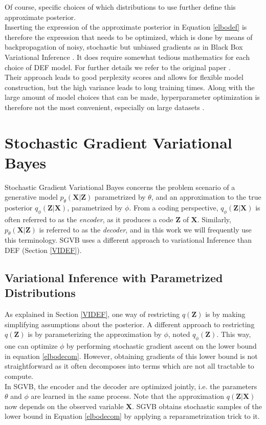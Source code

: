 \documentclass{report}
\begin{document}
Of course, specific choices of which distributions to use further define this approximate posterior. \\
Inserting the expression of the approximate posterior in Equation \ref{elbodef} is therefore the expression that needs to be optimized, which is done by means of backpropagation of noisy, stochastic but unbiased gradients as in Black Box Variational Inference \cite{ranganath2014black}. It does require somewhat tedious mathematics for each choice of DEF model. For further details we refer to the original paper \cite{ranganath2015deep}. \\
Their approach leads to good perplexity scores and allows for flexible model construction, but the high variance leads to long training times. Along with the large amount of model choices that can be made, hyperparameter optimization is therefore not the most convenient, especially on large datasets \cite{ranganath2015deep}.	

\section{Stochastic Gradient Variational Bayes}\label{sgvb_section}


Stochastic Gradient Variational Bayes concerns the problem scenario of a generative model $p_\theta(\mathbf{X}|\mathbf{Z})$ parametrized by $\theta$, and an approximation to the true posterior $q_\phi(\mathbf{Z}|\mathbf{X})$, parametrized by $\phi$. From a coding perspective, $q_\phi(\mathbf{Z}|\mathbf{X})$ is often referred to as the \textit{encoder}, as it produces a code $\mathbf{Z}$ of $\mathbf{X}$. Similarly, $p_\theta(\mathbf{X}|\mathbf{Z})$ is referred to as the \textit{decoder}, and in this work we will frequently use this terminology. SGVB uses a different approach to variational Inference than DEF (Section \ref{VIDEF}).

\subsection{Variational Inference with Parametrized Distributions}\label{paramVI}
As explained in Section \ref{VIDEF}, one way of restricting $q(\mathbf{Z})$ is by making simplifying assumptions about the posterior. A different approach to restricting $q(\mathbf{Z})$ is by parameterizing the approximation by $\phi$, noted $q_\phi(\mathbf{Z})$. This way, one can optimize $\phi$ by performing stochastic gradient ascent on the lower bound in equation \ref{elbodecom}. However, obtaining gradients of this lower bound is not straightforward as it often decomposes into terms which are not all tractable to compute.  \\
In SGVB, the encoder and the decoder are optimized jointly, i.e. the parameters $\theta$ and $\phi$ are learned in the same process. Note that the approximation $q(\mathbf{Z}|\mathbf{X})$ now depends on the observed variable $\mathbf{X}$. SGVB obtains stochastic samples of the lower bound in Equation \ref{elbodecom} by applying a reparametrization trick to it.
\end{document}

